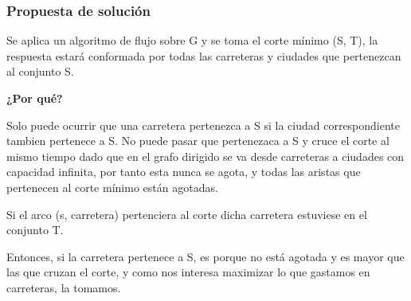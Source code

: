 \documentclass[10pt]{article} %
\begin{document}
%	
%	
%	
%	
	
	\subsubsection{Propuesta de soluci\'on}
	
	Se aplica un algoritmo de flujo sobre G y se toma el corte m\'inimo (S, T), la respuesta estar\'a conformada por todas las carreteras y ciudades que pertenezcan al conjunto S. 
	
	\textbf{¿Por qu\'e? }
	
	Solo puede ocurrir que una carretera pertenezca a S si la ciudad correspondiente tambien pertenece a S. No puede pasar que pertenezaca a S y cruce el corte al mismo tiempo dado que en el grafo dirigido se va desde carreteras a ciudades con capacidad infinita, por tanto esta nunca se agota, y todas las aristas que pertenecen al corte m\'inimo est\'an agotadas. 
	
	Si el arco (s, carretera) pertenciera al corte dicha carretera estuviese en el conjunto T. 
	
	Entonces, si la carretera pertenece a S, es porque no est\'a agotada y es mayor que las que cruzan el corte, y como nos interesa maximizar lo que gastamos en carreteras, la tomamos.
	
\end{document}
